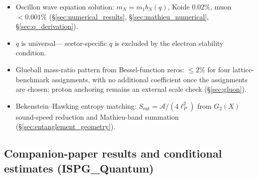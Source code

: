\documentclass[11pt]{article}
\begin{document}
\begin{itemize}
  \item[\checkmark] Oscillon wave equation solution:
    $m_N = m_1 b_N(q)$, Koide $0.02\%$,
    muon $< 0.001\%$
    (\S\ref{sec:numerical_results},
    \S\ref{sec:mathieu_numerical},
    \S\ref{sec:q_derivation}).
  \item[\checkmark] $q$ is universal---
    sector-specific $q$ is excluded
    by the electron stability condition.
  \item[\checkmark] Glueball mass-ratio pattern
    from Bessel-function zeros: $\leq 2\%$ for
    four lattice-benchmark assignments, with no
    additional coefficient once the assignments are
    chosen; proton anchoring remains an external
    scale check
    (\S\ref{sec:gluon}).
  \item[\checkmark] Bekenstein--Hawking entropy
    matching: $S_{\mathrm{ent}} = \mathcal{A}
    /(4\ell_P^2)$ from $G_2(X)$ sound-speed
    reduction and Mathieu-band summation
    (\S\ref{sec:entanglement_geometry}).
\end{itemize}

\subsection*{Companion-paper results and conditional estimates
(ISPG\_Quantum)}
\end{document}
